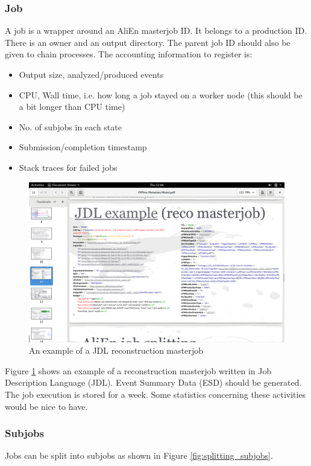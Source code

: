 \subsubsection{Job}

A job is a wrapper around an AliEn masterjob ID. It belongs to a production ID. There is an owner and an output directory. The parent job ID should also be given to chain processes. The accounting information to register is:
\begin{itemize}
  \item Output size, analyzed/produced events
  \item CPU, Wall time, i.e. how long a job stayed on a worker node (this should be a bit longer than CPU time)
  \item No. of subjobs in each state
  \item Submission/completion timestamp
  \item Stack traces for failed jobs
\end{itemize}


\begin{figure}
  \begin{center}
    \includegraphics[scale=0.15]{./images/jdl_example.png}
    \caption{An example of a JDL reconstruction masterjob}
    \label{fig:jdl_example}
  \end{center}
\end{figure}
Figure \ref{fig:jdl_example} shows an example of a reconstruction masterjob written in Job Description Language (JDL). Event Summary Data (ESD) should be generated. The job execution is stored for a week. Some statistics concerning these activities would be nice to have.

\subsubsection{Subjobs}
Jobs can be split into subjobs as shown in Figure \ref{fig:splitting_subjobs}.


